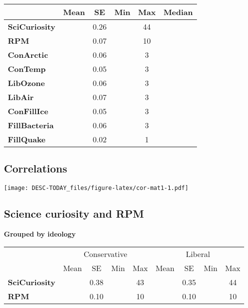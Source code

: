 \documentclass[
]{article}
\begin{document}
\begin{tabular}{>{}l||>{}c|c|>{}c|c|>{}c}
\hline
  & Mean & SE & Min & Max & Median\\
\hline
\textbf{SciCuriosity} & \cellcolor{lightgray}{24.73} & 0.26 & \cellcolor{lightgray}{9} & 44 & \cellcolor{lightgray}{25}\\
\hline
\textbf{RPM} & \cellcolor{lightgray}{5.64} & 0.07 & \cellcolor{lightgray}{1} & 10 & \cellcolor{lightgray}{6}\\
\hline
\textbf{ConArctic} & \cellcolor{lightgray}{-1.43} & 0.06 & \cellcolor{lightgray}{-3} & 3 & \cellcolor{lightgray}{-2}\\
\hline
\textbf{ConTemp} & \cellcolor{lightgray}{-1.69} & 0.05 & \cellcolor{lightgray}{-3} & 3 & \cellcolor{lightgray}{-2}\\
\hline
\textbf{LibOzone} & \cellcolor{lightgray}{-0.26} & 0.06 & \cellcolor{lightgray}{-3} & 3 & \cellcolor{lightgray}{-1}\\
\hline
\textbf{LibAir} & \cellcolor{lightgray}{-0.82} & 0.07 & \cellcolor{lightgray}{-3} & 3 & \cellcolor{lightgray}{-1}\\
\hline
\textbf{ConFillIce} & \cellcolor{lightgray}{-2.10} & 0.05 & \cellcolor{lightgray}{-3} & 3 & \cellcolor{lightgray}{-2}\\
\hline
\textbf{FillBacteria} & \cellcolor{lightgray}{-0.27} & 0.06 & \cellcolor{lightgray}{-3} & 3 & \cellcolor{lightgray}{0}\\
\hline
\textbf{FillQuake} & \cellcolor{lightgray}{0.31} & 0.02 & \cellcolor{lightgray}{0} & 1 & \cellcolor{lightgray}{0}\\
\hline
\end{tabular}

\hypertarget{correlations}{%
\subsection{Correlations}\label{correlations}}

\texttt{[image: DESC-TODAY\_files/figure-latex/cor-mat1-1.pdf]}

\hypertarget{science-curiosity-and-rpm}{%
\subsection{Science curiosity and RPM}\label{science-curiosity-and-rpm}}

\textbf{Grouped by ideology}

\begin{tabular}{>{}l||>{}c|c|>{}c|>{}c||>{}c|c|>{}c|c}
\hline
\multicolumn{1}{c|}{ } & \multicolumn{4}{c|}{Conservative} & \multicolumn{4}{c}{Liberal} \\
\cline{2-5} \cline{6-9}
  & Mean & SE & Min & Max & Mean & SE & Min & Max\\
\hline
\textbf{SciCuriosity} & \cellcolor{lightgray}{24.12} & 0.38 & \cellcolor{lightgray}{9} & 43 & \cellcolor{lightgray}{25.25} & 0.35 & \cellcolor{lightgray}{9} & 44\\
\hline
\textbf{RPM} & \cellcolor{lightgray}{5.55} & 0.10 & \cellcolor{lightgray}{1} & 10 & \cellcolor{lightgray}{5.71} & 0.10 & \cellcolor{lightgray}{1} & 10\\
\hline
\end{tabular}
\end{document}
